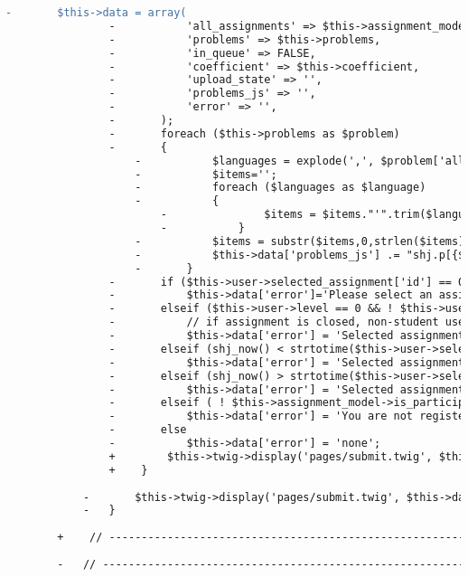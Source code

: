 \begin{lstlisting}[language=diff, caption=Perubahan pada kode Submit.php]
				-		$this->data = array(
				-			'all_assignments' => $this->assignment_model->all_assignments(),
				-			'problems' => $this->problems,
				-			'in_queue' => FALSE,
				-			'coefficient' => $this->coefficient,
				-			'upload_state' => '',
				-			'problems_js' => '',
				-			'error' => '',
				-		);
				-		foreach ($this->problems as $problem)
				-		{
					-			$languages = explode(',', $problem['allowed_languages']);
					-			$items='';
					-			foreach ($languages as $language)
					-			{
						-				$items = $items."'".trim($language)."',";
						-			}
					-			$items = substr($items,0,strlen($items)-1);
					-			$this->data['problems_js'] .= "shj.p[{$problem['id']}]=[{$items}]; ";
					-		}
				-		if ($this->user->selected_assignment['id'] == 0)
				-			$this->data['error']='Please select an assignment first.';
				-		elseif ($this->user->level == 0 && ! $this->user->selected_assignment['open'])
				-			// if assignment is closed, non-student users (admin, instructors) still can submit
				-			$this->data['error'] = 'Selected assignment is closed.';
				-		elseif (shj_now() < strtotime($this->user->selected_assignment['start_time']))
				-			$this->data['error'] = 'Selected assignment has not started.';
				-		elseif (shj_now() > strtotime($this->user->selected_assignment['finish_time'])+$this->user->selected_assignment['extra_time']) // deadline = finish_time + extra_time
				-			$this->data['error'] = 'Selected assignment has finished.';
				-		elseif ( ! $this->assignment_model->is_participant($this->user->selected_assignment['participants'],$this->user->username) )
				-			$this->data['error'] = 'You are not registered for submitting.';
				-		else
				-			$this->data['error'] = 'none';
				+        $this->twig->display('pages/submit.twig', $this->data);
				+    }
			
			-		$this->twig->display('pages/submit.twig', $this->data);
			-	}
		
		+    // ------------------------------------------------------------------------
		
		-	// ------------------------------------------------------------------------
		

\end{lstlisting}

